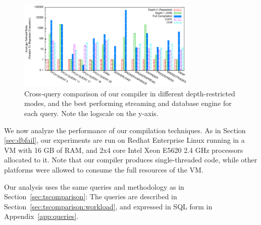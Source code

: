 
\newcommand{\figurewidth}[0]{1.8in}

\newcommand{\tablefig}[1]{
  \hspace*{-0.25in}
  \texttt{[image: ../graphs/graphs/\#1]}
}

\begin{figure}
\begin{center}
\includegraphics[width=3.4in]{../graphs/graphs/bakeoff.pdf}
\caption{Cross-query comparison of our compiler in different depth-restricted modes, and the best performing streaming and database engine for each query.  Note the logscale on the y-axis.}
\label{fig:experiments:bakeoff}
\end{center}
\end{figure}

We now analyze the performance of our compilation techniques.  As in Section \ref{sec:dbfail}, our experiments are run on Redhat Enterprise Linux running in a VM with 16 GB of RAM, and 2x4 core Intel Xeon E5620 2.4 GHz processors allocated to it.  Note that our compiler produces single-threaded code, while other platforms were allowed to consume the full resources of the VM.

Our analysis uses the same queries and methodology as in Section~\ref{sec:tscomparison}: The queries are described in Section~\ref{sec:tscomparison:workload}, and expressed in SQL form in Appendix~\ref{app:queries}.



